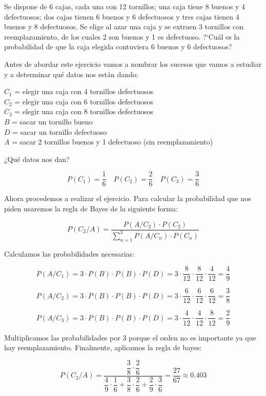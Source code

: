 \problem

Se dispone de  6 cajas,  cada una con 12 tornillos; una caja tiene 8 buenos y 4 defectuosos; dos cajas tienen  6  buenos  y 6 defectuosos y tres cajas tienen 4 buenos y 8 defectuosos. Se  elige  al azar una caja y se extraen 3  tornillos con reemplazamiento, de los cuales 2 son buenos y 1 es defectuoso. ?`Cu{\'a}l es la probabilidad de  que
la caja elegida contuviera 6 buenos y 6 defectuosos?

Antes de abordar este ejercicio vamos a nombrar los sucesos que vamos a estudiar y a determinar qué datos nos están dando:

$C_1$ = elegir una caja con 4 tornillos defectuosos\\
$C_2$ = elegir una caja con 6 tornillos defectuosos\\
$C_3$ = elegir una caja con 8 tornillos defectuosos\\
$B$ = sacar un tornillo bueno\\
$D$ = sacar un tornillo defectuoso\\
$A$ = sacar 2 tornillos buenos y 1 defectuoso (sin reemplazamiento)

¿Qué datos nos dan?

\begin{equation*}
    P(C_1) = \dfrac{1}{6}
    \quad
    P(C_2) = \dfrac{2}{6}
    \quad
    P(C_3) = \dfrac{3}{6}
\end{equation*}

Ahora procedemos a realizar el ejercicio. Para calcular la probabilidad que nos piden usaremos la regla de Bayes de la siguiente forma:

\begin{equation*}
    P(C_2/A) = \dfrac{P(A/C_2) \cdot P(C_2)}{\sum_{n=1}^3 P(A/C_n) \cdot P(C_n)}
\end{equation*}

Calculamos las probabilidades necesarias:

\begin{equation*}
    P(A/C_1) = 3 \cdot P(B) \cdot P(B) \cdot P(D) = 3 \cdot \dfrac{8}{12} \cdot \dfrac{8}{12} \cdot \dfrac{4}{12} = \dfrac{4}{9}
\end{equation*}
    
\begin{equation*}
    P(A/C_2) = 3 \cdot P(B) \cdot P(B) \cdot P(D) = 3 \cdot \dfrac{6}{12} \cdot \dfrac{6}{12} \cdot \dfrac{6}{12} = \dfrac{3}{8}
\end{equation*}

\begin{equation*}
    P(A/C_3) = 3 \cdot P(B) \cdot P(B) \cdot P(D) = 3 \cdot \dfrac{4}{12} \cdot \dfrac{4}{12} \cdot \dfrac{8}{12} = \dfrac{2}{9}
\end{equation*}

Multiplicamos las probabilidades por $3$ porque el orden no es importante ya que hay reemplazamiento. Finalmente, aplicamos la regla de bayes:

\begin{equation*}
    P(C_2/A) = \dfrac{\dfrac{3}{8} \cdot \dfrac{2}{6}}{\dfrac{4}{9} \cdot \dfrac{1}{6} + \dfrac{3}{8} \cdot \dfrac{2}{6} + \dfrac{2}{9} \cdot \dfrac{3}{6}} = \dfrac{27}{67} \approx 0.403
\end{equation*}
